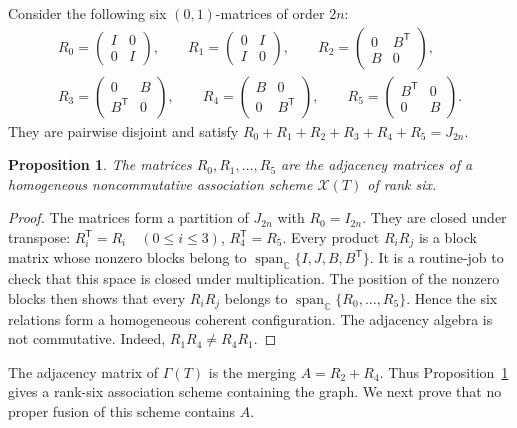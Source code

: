\documentclass[11pt]{article}
\newtheorem{proposition}[theorem]{Proposition}
\theoremstyle{definition}
\theoremstyle{remark}
\begin{document}
Consider the following six $(0,1)$-matrices of order $2n$:
\[
\begin{gathered}
R_0=\begin{pmatrix}I&0\\0&I\end{pmatrix},
\qquad
R_1=\begin{pmatrix}0&I\\I&0\end{pmatrix},
\qquad
R_2=\begin{pmatrix}0&B^{\mathsf T}\\B&0\end{pmatrix},\\[1mm]
R_3=\begin{pmatrix}0&B\\B^{\mathsf T}&0\end{pmatrix},
\qquad
R_4=\begin{pmatrix}B&0\\0&B^{\mathsf T}\end{pmatrix},
\qquad
R_5=\begin{pmatrix}B^{\mathsf T}&0\\0&B\end{pmatrix}.
\end{gathered}
\]
They are pairwise disjoint and satisfy
 $R_0+R_1+R_2+R_3+R_4+R_5=J_{2n}$.

\begin{proposition}
\label{prop:rank}
The matrices $R_0,R_1,\ldots,R_5$ are the adjacency matrices of a
homogeneous noncommutative association scheme $\mathcal X(T)$ of rank six.
\end{proposition}

\begin{proof}
The matrices form a partition of $J_{2n}$ with $R_0=I_{2n}$.  They are closed under transpose:
$ R_i^{\mathsf T}=R_i\quad(0\leq i\leq3)$,
$R_4^{\mathsf T}=R_5$.
Every product $R_iR_j$ is a block matrix whose nonzero blocks belong to
$\operatorname{span}_{\mathbb C}\{I,J,B,B^{\mathsf T}\}$.
It is a routine-job to check that this space
is closed under multiplication.  The position of the nonzero blocks then
shows that every $R_iR_j$ belongs to
$\operatorname{span}_{\mathbb C}\{R_0,\ldots,R_5\}$.  Hence the six
relations form a homogeneous coherent configuration.
The adjacency algebra is not commutative.  Indeed,
$R_1R_4\neq R_4R_1$.
\end{proof}

The adjacency matrix of $\Gamma(T)$ is the merging $A=R_2+R_4$.
Thus Proposition~\ref{prop:rank} gives a rank-six association
scheme containing the graph.  We next prove that no proper fusion of this
scheme contains $A$.
\end{document}
